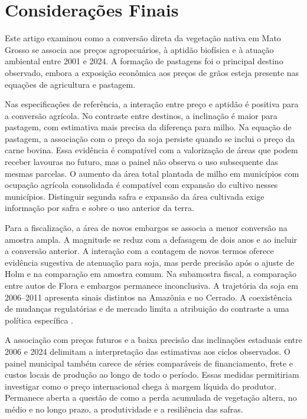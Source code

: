 \section{Considerações Finais}
\label{sec:conclusao}

Este artigo examinou como a conversão direta da vegetação nativa em Mato Grosso se associa aos preços agropecuários, à aptidão biofísica e à atuação ambiental entre 2001 e 2024. A formação de pastagens foi o principal destino observado, embora a exposição econômica aos preços de grãos esteja presente nas equações de agricultura e pastagem.

Nas especificações de referência, a interação entre preço e aptidão é positiva para a conversão agrícola. No contraste entre destinos, a inclinação é maior para pastagem, com estimativa mais precisa da diferença para milho. Na equação de pastagem, a associação com o preço da soja persiste quando se inclui o preço da carne bovina. Essa evidência é compatível com a valorização de áreas que podem receber lavouras no futuro, mas o painel não observa o uso subsequente das mesmas parcelas. O aumento da área total plantada de milho em municípios com ocupação agrícola consolidada é compatível com expansão do cultivo nesses municípios. Distinguir segunda safra e expansão da área cultivada exige informação por safra e sobre o uso anterior da terra.

Para a fiscalização, a área de novos embargos se associa a menor conversão na amostra ampla. A magnitude se reduz com a defasagem de dois anos e ao incluir a conversão anterior. A interação com a contagem de novos termos oferece evidência sugestiva de atenuação para soja, mas perde precisão após o ajuste de Holm e na comparação em amostra comum. Na subamostra fiscal, a comparação entre autos de Flora e embargos permanece inconclusiva. A trajetória da soja em 2006--2011 apresenta sinais distintos na Amazônia e no Cerrado. A coexistência de mudanças regulatórias e de mercado limita a atribuição do contraste a uma política específica \cite{AssuncaoEtAl2015, Shimshack2014, Sousa2016, HardingEtAl2021, HeilmayrEtAl2020}.

A associação com preços futuros e a baixa precisão das inclinações estaduais entre 2006 e 2024 delimitam a interpretação das estimativas aos ciclos observados. O painel municipal também carece de séries comparáveis de financiamento, frete e custos locais de produção ao longo de todo o período. Essas medidas permitiriam investigar como o preço internacional chega à margem líquida do produtor. Permanece aberta a questão de como a perda acumulada de vegetação altera, no médio e no longo prazo, a produtividade e a resiliência das safras.
